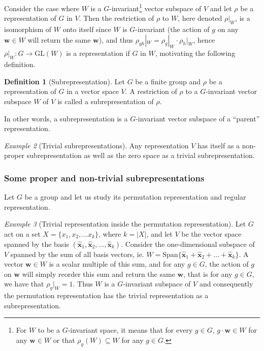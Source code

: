 \documentclass[12pt, a4paper, twoside]{article}
\theoremstyle{definition}
\newtheorem{definition}{Definition}[section]
\theoremstyle{remark}
\newtheorem{example}[definition]{Example}
\numberwithin{equation}{section}
\newcommand{\1}{\mathbf{1}}
\newcommand{\0}{\mathbf{0}}
\newcommand{\GL}{\text{GL}}
\newcommand{\Span}{\text{Span}}
\newcommand{\xhat}{\mathbf{\hat{x}}}
\newcommand{\wvec}{\mathbf{w}}
\begin{document}
	Consider the case where $W$ is a $G$-invariant\footnote{For $W$ to be a $G$-invariant space, it means that for every $g \in G$, $g \cdot \wvec \in W$ for any $\wvec \in W$ or that $\rho_g(W) \subseteq W$ for any $g\in G$.} vector subspace of $V$%
	and let $\rho$ be a representation of $G$ in $V$. Then the restriction of $\rho$ to $W$, here denoted $\rho|_W$, is a isomorphism of $W$ onto itself since $W$ is $G$-invariant (the action of $g$ on any $\wvec \in W$ will return the same $\wvec$), and thus $\rho_{gh}|_W = \rho_g|_W \cdot \rho_h|_W$, hence $\rho|_W: G \rightarrow \GL(W)$ is a representation if $G$ in $W$, motivating the following definition.
	
	\begin{definition}[Subrepresentation]\label{def:subrepr}
		Let $G$ be a finite group and $\rho$ be a representation of $G$ in a vector space $V$. A restriction of $\rho$ to a $G$-invariant vector subspace $W$ of $V$ is called a subrepresentation of $\rho$.
	\end{definition}
	
	In other words, a subrepresentation is a $G$-invariant vector subspace of a ``parent'' representation. 
	
	\begin{example}[Trivial subrepresentations]
		Any representation $V$ has itself as a non-proper subrepresentation as well as the zero space as a trivial subrepresentation.
	\end{example}
	
\subsubsection{Some proper and non-trivial subrepresentations}

	Let $G$ be a group and let us study its permutation representation and regular representation. 
	
	\begin{example}[Trivial representation inside the permutation representation]\cite[Example 1.4.3.]{Sagan}
		Let $G$ act on a set $X = \{x_1, x_2, \dots x_k\}$, where $k = |X|$, and let $V$ be the vector space spanned by the basis $(\xhat_1, \xhat_2, \dots, \xhat_k)$. Consider the one-dimensional subspace of $V$ spanned by the sum of all basis vectors, ie. $W = \Span\{ \xhat_1 + \xhat_2 + \dots + \xhat_k \}$. A vector $\wvec \in W$ is a scalar multiple of this sum, and for any $g \in G$, the action of $g$ on $\wvec$ will simply reorder this sum and return the same $\wvec$, that is for any $g \in G$, we have that $\rho_g|_W = 1$. Thus $W$ is a $G$-invariant subspace of $V$ and consequently the permutation representation has the trivial representation as a subrepresentation.
	\end{example}
	
\end{document}
